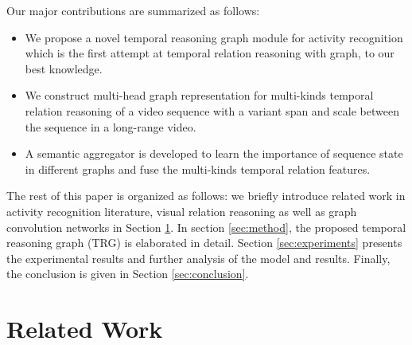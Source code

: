 \documentclass[conference,compsoc]{IEEEtran}
\begin{document}
    Our major contributions are summarized as follows:
    \begin{itemize}
        \item We propose a novel temporal reasoning graph module for activity recognition which is the first attempt at temporal relation reasoning with graph, to our best knowledge.
        \item We construct multi-head graph representation for multi-kinds temporal relation reasoning of a video sequence with a variant span and scale between the sequence in a long-range video.
        \item  A semantic aggregator is developed to learn the importance of sequence state in different graphs and fuse the multi-kinds temporal relation features.
\end{itemize}
    
    The rest of this paper is organized as follows: we briefly introduce related work in activity recognition literature, visual relation reasoning as well as graph convolution networks in Section \ref{sec:related}. In section \ref{sec:method}, the proposed temporal reasoning graph (TRG) is elaborated in detail. Section \ref{sec:experiments} presents the experimental results and further analysis of the model and results. Finally, the conclusion is given in Section \ref{sec:conclusion}.

\section{Related Work}
\label{sec:related}
\end{document}
